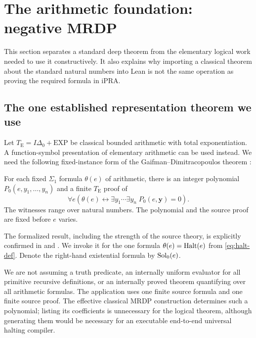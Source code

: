\section{The arithmetic foundation: negative MRDP}
\label{sec:foundation}

This section separates a standard deep theorem from the elementary logical
work needed to use it constructively. It also explains why importing a
classical theorem about the standard natural numbers into Lean is not the
same operation as proving the required formula in iPRA.

\subsection{The one established representation theorem we use}

Let $T_{\mathrm E}=I\Delta_0+\mathrm{EXP}$ be classical bounded arithmetic
with total exponentiation. A function-symbol presentation of elementary
arithmetic can be used instead. We need the following fixed-instance form
of the Gaifman--Dimitracopoulos theorem \cite{gd}:

\begin{theorem}\label{thm:efa-mrdp}
For each fixed $\Sigma_1$ formula $\theta(e)$ of arithmetic, there is an
integer polynomial $P_0(e,y_1,\ldots,y_n)$ and a finite
$T_{\mathrm E}$ proof of
\[
 \forall e\left(\theta(e)\longleftrightarrow
       \exists y_1\cdots\exists y_n\;P_0(e,\boldsymbol y)=0\right).
\]
The witnesses range over natural numbers. The polynomial and the source
proof are fixed before $e$ varies.
\end{theorem}

The formalized result, including the strength of the source theory, is
explicitly confirmed in \cite[Section 1.2, p.~3 of the author preprint]{cmy}
and \cite[slide 4]{jerabek}. We invoke it for the one formula
$\theta(e)=\operatorname{Halt}(e)$ from \eqref{eq:halt-def}. Denote the right-hand
existential formula by $\operatorname{Sol}_0(e)$.

We are not assuming a truth predicate, an internally uniform evaluator
for all primitive recursive definitions, or an internally proved theorem
quantifying over all arithmetic formulas. The application uses one finite
source formula and one finite source proof. The effective classical MRDP
construction determines such a polynomial; listing its coefficients is
unnecessary for the logical theorem, although generating them would be
necessary for an executable end-to-end universal halting compiler.

